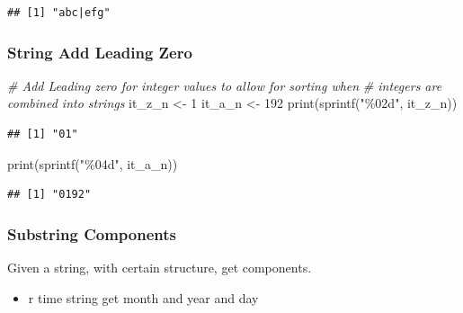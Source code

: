 \documentclass[
]{book}
\newenvironment{Shaded}{\begin{snugshade}}{\end{snugshade}}
\newcommand{\CommentTok}[1]{\textcolor[rgb]{0.56,0.35,0.01}{\textit{#1}}}
\newcommand{\DecValTok}[1]{\textcolor[rgb]{0.00,0.00,0.81}{#1}}
\newcommand{\FunctionTok}[1]{\textcolor[rgb]{0.00,0.00,0.00}{#1}}
\newcommand{\NormalTok}[1]{#1}
\newcommand{\OtherTok}[1]{\textcolor[rgb]{0.56,0.35,0.01}{#1}}
\newcommand{\StringTok}[1]{\textcolor[rgb]{0.31,0.60,0.02}{#1}}
\providecommand{\tightlist}{%
  \setlength{\itemsep}{0pt}\setlength{\parskip}{0pt}}
\begin{document}
\begin{verbatim}
## [1] "abc|efg"
\end{verbatim}

\hypertarget{string-add-leading-zero}{%
\subsubsection{String Add Leading Zero}\label{string-add-leading-zero}}

\begin{Shaded}
\begin{Highlighting}[]
\CommentTok{\# Add Leading zero for integer values to allow for sorting when}
\CommentTok{\# integers are combined into strings}
\NormalTok{it\_z\_n }\OtherTok{\textless{}{-}} \DecValTok{1}
\NormalTok{it\_a\_n }\OtherTok{\textless{}{-}} \DecValTok{192}
\FunctionTok{print}\NormalTok{(}\FunctionTok{sprintf}\NormalTok{(}\StringTok{"\%02d"}\NormalTok{, it\_z\_n))}
\end{Highlighting}
\end{Shaded}

\begin{verbatim}
## [1] "01"
\end{verbatim}

\begin{Shaded}
\begin{Highlighting}[]
\FunctionTok{print}\NormalTok{(}\FunctionTok{sprintf}\NormalTok{(}\StringTok{"\%04d"}\NormalTok{, it\_a\_n))}
\end{Highlighting}
\end{Shaded}

\begin{verbatim}
## [1] "0192"
\end{verbatim}

\hypertarget{substring-components}{%
\subsubsection{Substring Components}\label{substring-components}}

Given a string, with certain structure, get components.

\begin{itemize}
\tightlist
\item
  r time string get month and year and day
\end{itemize}
\end{document}
